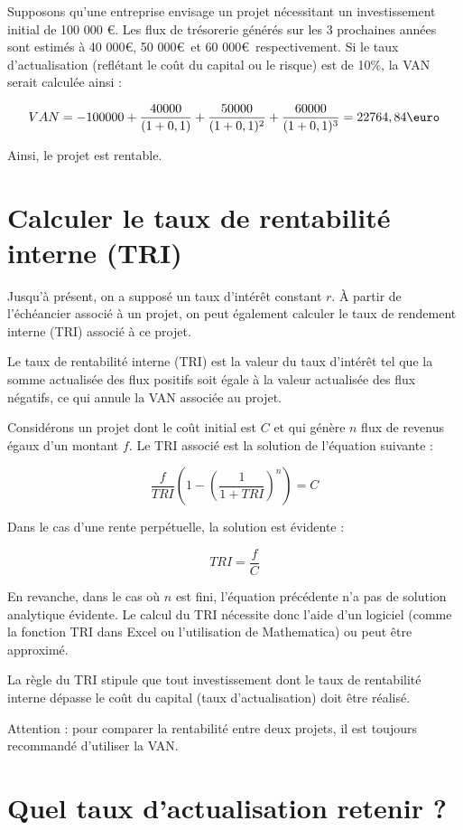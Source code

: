 \documentclass[a4paper, 12pt]{report}
\begin{document}
Supposons qu'une entreprise envisage un projet nécessitant un investissement initial de 100 000 €. Les flux de trésorerie générés sur les 3 prochaines années sont estimés à 40 000\euro, 50 000\euro~et 60 000\euro~respectivement. Si le taux d'actualisation (reflétant le coût du capital ou le risque) est de 10\%, la VAN serait calculée ainsi :

\[
VAN = -100000 + \frac{40000}{(1+0,1)} + \frac{50000}{(1+0,1)^2} + \frac{60000}{(1+0,1)^3} = 22764,84\text{\euro}
\]

Ainsi, le projet est rentable.

\section{Calculer le taux de rentabilité interne (TRI)}

Jusqu’à présent, on a supposé un taux d’intérêt constant \( r \). À partir de l'échéancier associé à un projet, on peut également calculer le taux de rendement interne (TRI) associé à ce projet.

Le taux de rentabilité interne (TRI) est la valeur du taux d'intérêt tel que la somme actualisée des flux positifs soit égale à la valeur actualisée des flux négatifs, ce qui annule la VAN associée au projet.

Considérons un projet dont le coût initial est \( C \) et qui génère \( n \) flux de revenus égaux d'un montant \( f \). Le TRI associé est la solution de l'équation suivante :

\[
\frac{f}{TRI} \left( 1 - \left( \frac{1}{1 + TRI} \right)^{n} \right) = C
\]

Dans le cas d'une rente perpétuelle, la solution est évidente :

\[
TRI = \frac{f}{C}
\]

En revanche, dans le cas où \( n \) est fini, l'équation précédente n'a pas de solution analytique évidente. Le calcul du TRI nécessite donc l'aide d'un logiciel (comme la fonction TRI dans Excel ou l'utilisation de Mathematica) ou peut être approximé.

La règle du TRI stipule que tout investissement dont le taux de rentabilité interne dépasse le coût du capital (taux d’actualisation) doit être réalisé. 

Attention : pour comparer la rentabilité entre deux projets, il est toujours recommandé d'utiliser la VAN.

\section{Quel taux d'actualisation retenir ?}
\end{document}
